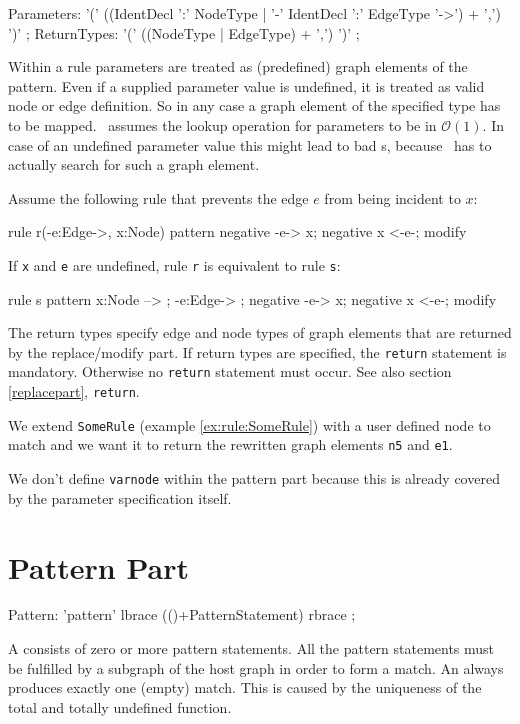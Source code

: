 \begin{rail}
  Parameters: '(' ((IdentDecl ':' NodeType | '-' IdentDecl ':' EdgeType '->') + ',') ')' ;
  ReturnTypes: '(' ((NodeType | EdgeType) + ',') ')' ;
\end{rail}
Within a rule parameters are treated as (predefined) graph elements of the pattern. Even if a supplied parameter value is undefined, it is treated as valid node or edge definition. So in any case a graph element of the specified type has to be mapped. \GrG\ assumes the lookup operation for parameters to be in $\mathcal{O}(1)$. In case of an undefined parameter value this might lead to bad s, because \GrG\ has to actually search for such a graph element.
\begin{example}
Assume the following rule that prevents the edge $e$ from being incident to $x$:
\begin{grgen}
rule r(-e:Edge->, x:Node) {
  pattern {
    negative {
      -e-> x;
    }
    negative {
      x <-e-;
    }
  }
  modify {}
}
\end{grgen}
If \texttt{x} and \texttt{e} are undefined, rule \texttt{r} is equivalent to rule \texttt{s}:
\begin{grgen}
rule s {
  pattern {
    x:Node --> ;
    -e:Edge-> ;
    negative {
      -e-> x;
    }
    negative {
      x <-e-;
    }
  }
  modify {}
}
\end{grgen}
\end{example}
The return types specify edge and node types of graph elements that are returned by the replace/modify part. If return types are specified, the \texttt{return} statement is mandatory. Otherwise no \texttt{return} statement must occur. See also section \ref{replacepart}, \texttt{return}.
\begin{example}\label{ex:rule:someruleext}
We extend \texttt{SomeRule} (example \ref{ex:rule:SomeRule}) with a user defined node to match and we want it to return the rewritten graph elements \texttt{n5} and \texttt{e1}.
\begin{grgen}
  rule SomeRuleExt(varnode: Node): (Node, EdgeTypeB) {
    pattern {
      n1: NodeTypeA;
      ...
    }
    replace {
      varnode;
      ...  
      return(n5, e1);
      eval {
        ...
\end{grgen}
We don't define \texttt{varnode} within the pattern part because this is already covered by the parameter specification itself.
\end{example}

\section{Pattern Part}
\label{patternpart}
\begin{rail}
  Pattern: 'pattern' lbrace (()+PatternStatement) rbrace ;
\end{rail}
A  consists of zero or more pattern statements. 
All the pattern statements must be fulfilled by a subgraph of the host graph in order to form a match. 
An  always produces exactly one (empty) match. 
This is caused by the uniqueness of the total and totally undefined function.


